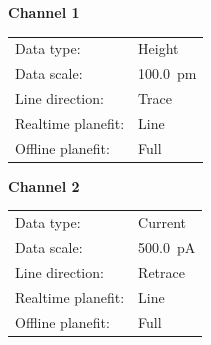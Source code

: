 \documentclass[12pt,a4paper]{article}
\begin{document}
\begin{figure}[H]
\begin{minipage}[t]{0.48\linewidth}
        \vspace{0.5cm}
        
        \textbf{Channel 1}
        \begin{tabular}{|l|l|}
        \hline
        Data type: & Height \\
        Data scale: & \SI{100.0}{\pico\meter} \\
        Line direction: & Trace \\
        Realtime planefit: & Line \\
        Offline planefit: & Full \\
        \hline
        \end{tabular}
        
        \vspace{0.5cm}
        
        \textbf{Channel 2}
        \begin{tabular}{|l|l|}
        \hline
        Data type: & Current \\
        Data scale: & \SI{500.0}{\pico\ampere} \\
        Line direction: & Retrace \\
        Realtime planefit: & Line \\
        Offline planefit: & Full \\
        \hline
        \end{tabular}
    \end{minipage}
\end{figure}
\end{document}
